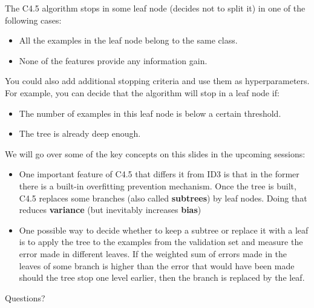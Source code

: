 \documentclass[9pt,dvipsnames]{beamer}
\begin{document}
	\begin{frame}
		The C4.5 algorithm stops in some leaf node (decides not to split it) in one of the following cases:
		
		\begin{itemize}
			\item All the examples in the leaf node belong to the same class.
			\item None of the features provide any information gain.
		\end{itemize}
		You could also add additional stopping criteria and use them as hyperparameters. For example, you can decide that the algorithm will stop in a leaf node if:
		\begin{itemize}
			\item The number of examples in this leaf node is below a certain threshold.
			\item The tree is already deep enough.
		\end{itemize}
	\end{frame}
	
	\begin{frame}
		We will go over some of the key concepts on this slides in the upcoming sessions:
		\begin{itemize}
			\item One important feature of C4.5 that differs it from ID3 is that in the former there is a built-in overfitting prevention mechanism. Once the tree is built, C4.5 replaces some branches (also called \textbf{subtrees}) by leaf nodes. Doing that reduces \textbf{variance} (but inevitably increases \textbf{bias})
			\item One possible way to decide whether to keep a subtree or replace it with a leaf is to apply the tree to the examples from the validation set and measure the error made in different leaves. If the weighted sum of errors made in the leaves of some branch is higher than the error that would have been made should the tree stop one level earlier, then the branch is replaced by the leaf.
		\end{itemize}
	\end{frame}
	
	\begin{frame}
		\begin{center}
			\Huge Questions?
		\end{center}
	\end{frame}
\end{document}
